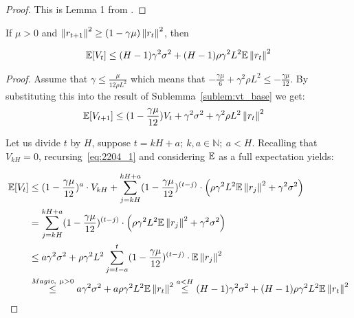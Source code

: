 \begin{proof}
    This is Lemma 1 from \cite{Khaled}. 
\end{proof}


\begin{sublemma} \label{sublem:vt>0}
If $\mu > 0$ and $\norm{r_{t+1}}^2 \geq (1 - \gamma \mu) \norm{r_t}^2$, then

    \begin{align}
        \E [V_t] 
        \leq
         (H-1) \gamma^2 \sigma^2 +
        (H-1) \rho \gamma^2 L^2 \E \norm{r_t}^2
    \end{align}

\end{sublemma}

\begin{proof}
    Assume that $ \gamma \leq \frac{\mu}{12\rho L^2} $ which means that $-\frac{\gamma \mu }{6} + \gamma^2 \rho L^2 \leq -\frac{\gamma \mu}{12}$. By substituting this into the result of Sublemma~\ref{sublem:vt_base} we get:
    \begin{align}
        \E [V_{t+1}]
        &\leq
        (1 - \frac {\gamma \mu}{12}) V_t
        + \gamma^2 \sigma^2 + \gamma^2 \rho L^2 \norm{r_t}^2
        \label{eq:2204_1}
    \end{align}
    

    Let us divide $t$ by $H$, suppose $t = kH + a; \ k, a \in \mathbb{N}; \ a < H$.
    Recalling that $V_{kH} = 0$, recursing~\eqref{eq:2204_1} and considering $\E$ as a full expectation yields:
    
    \begin{align}
        \E [V_{t}]
        &\leq
        (1 - \frac{\gamma \mu}{12})^a  \cdot V_{kH} 
        +
        \summ{j=kH}{kH+a}
        (1 - \frac{\gamma \mu} {12})^{(t-j)}
        \cdot
        \left(
        \rho \gamma^2 L^2 \E \norm{r_j}^2 + \gamma^2 \sigma^2
        \right) \\
        &=
        \summ{j=kH}{kH+a}
        (1 - \frac{\gamma \mu} {12})^{(t-j)}
        \cdot 
        \left(
        \rho \gamma^2 L^2 \E \norm{r_j}^2 + \gamma^2 \sigma^2
        \right) \\
        &\leq
        a \gamma^2 \sigma^2 +
        \rho \gamma^2 L^2 \summ{j=t-a}{t}
        (1 - \frac{\gamma \mu} {12})^{(t-j)}
        \cdot \E \norm{r_j}^2 \\
        &\overset{Magic,\ \mu > 0}{\leq}
        a \gamma^2 \sigma^2 + a \rho \gamma^2 L^2 \E \norm{r_t}^2 
        \overset{a < H}{\leq}
        (H-1) \gamma^2 \sigma^2 + (H-1) \rho \gamma^2 L^2 \E \norm{r_t}^2 
    \end{align}
\end{proof}
